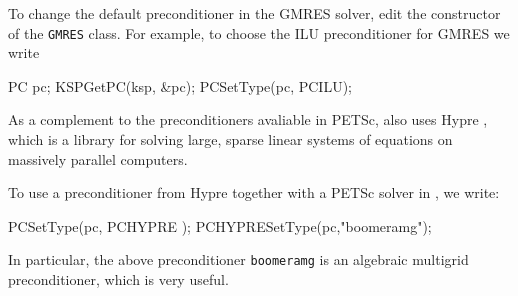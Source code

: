To change the default preconditioner in the \dolfin{} GMRES solver, edit the 
constructor of the \texttt{GMRES} class. For example, to choose the 
ILU preconditioner for GMRES we write 
%
\begin{code}
PC pc;
KSPGetPC(ksp, &pc);
PCSetType(pc, PCILU);
\end{code}

As a complement to the preconditioners avaliable in PETSc, 
\dolfin{} also uses Hypre \cite{www:hypre}, which is a 
library for solving large, sparse linear systems of equations on 
massively parallel computers. 

To use a preconditioner from Hypre together with a PETSc solver in \dolfin{}, we write:  
%
\begin{code}
PCSetType(pc, PCHYPRE );
PCHYPRESetType(pc,"boomeramg");
\end{code}

In particular, the above preconditioner \texttt{boomeramg} is an algebraic multigrid 
preconditioner, which is very useful. 

